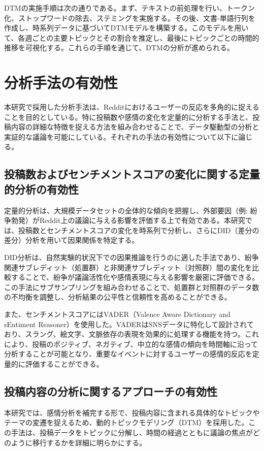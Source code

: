 \documentclass[11pt, a4j]{jreport}
\begin{document}
    DTMの実施手順は次の通りである。まず、テキストの前処理を行い、トークン化、ストップワードの除去、ステミングを実施する。その後、文書-単語行列を作成し、時系列データに基づいてDTMモデルを構築する。このモデルを用いて、各週ごとの主要トピックとその割合を推定し、最後にトピックごとの時間的推移を可視化する。これらの手順を通じて、DTMの分析が進められる。

    \section{分析手法の有効性}
    本研究で採用した分析手法は、Redditにおけるユーザーの反応を多角的に捉えることを目的としている。特に投稿数や感情の変化を定量的に分析する手法と、投稿内容の詳細な特徴を捉える方法を組み合わせることで、データ駆動型の分析と実証的な議論を可能にしている。それぞれの手法の有効性について以下に論じる。

    \subsection{投稿数およびセンチメントスコアの変化に関する定量的分析の有効性}
    定量的分析は、大規模データセットの全体的な傾向を把握し、外部要因（例: 紛争勃発）がReddit上の議論に与える影響を評価する上で有効である。本研究では、投稿数とセンチメントスコアの変化を時系列で分析し、さらにDID（差分の差分）分析を用いて因果関係を特定する。

    DID分析は、自然実験的状況下での因果推論を行うのに適した手法であり、紛争関連サブレディット（処置群）と非関連サブレディット（対照群）間の変化を比較することで、紛争が議論活性化や感情表現に与える影響を厳密に評価できる。この手法にサブサンプリングを組み合わせることで、処置群と対照群のデータ数の不均衡を調整し、分析結果の公平性と信頼性を高めることができる。

    また、センチメントスコアにはVADER（Valence Aware Dictionary and sEntiment Reasoner）を使用した。VADERはSNSデータに特化して設計されており、スラング、絵文字、文脈依存の表現を効果的に処理する機能を持つ。これにより、投稿のポジティブ、ネガティブ、中立的な感情の傾向を時間軸に沿って分析することが可能となり、重要なイベントに対するユーザーの感情的反応を定量的に評価することができる。

    \subsection{投稿内容の分析に関するアプローチの有効性}
    本研究では、感情分析を補完する形で、投稿内容に含まれる具体的なトピックやテーマの変遷を捉えるため、動的トピックモデリング（DTM）を採用した。この手法は、投稿データをトピックに分解し、時間の経過とともに議論の焦点がどのように移行するかを詳細に明らかにする。
\end{document}
